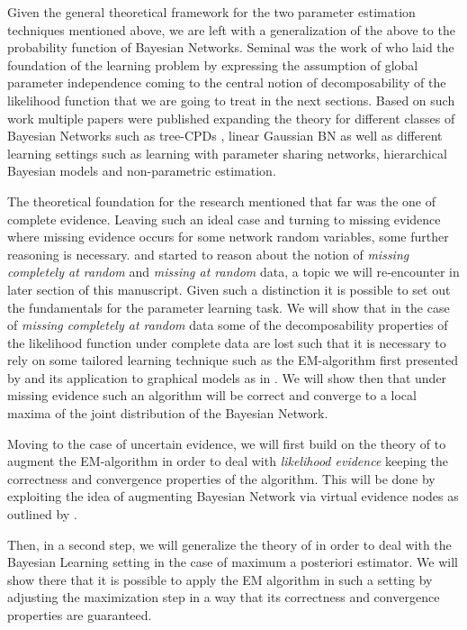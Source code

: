 \documentclass[11pt]{article}
\begin{document}
\begin{article}
Given the general theoretical framework for the two parameter
estimation techniques mentioned above, we are left with a
generalization of the above to the probability function of Bayesian
Networks. Seminal was the work of \cite{spiegelhalter1990sequential}
who laid the foundation of the learning problem by expressing the
assumption of global parameter independence coming to the central
notion of decomposability of the likelihood function that we are
going to treat in the next sections. Based on such work multiple
papers were published expanding the theory for different classes of
Bayesian Networks such as tree-CPDs \cite{buntine1993tree}, linear
Gaussian BN \cite{heckerman1995learning} as well as different
learning settings such as learning with parameter sharing networks,
hierarchical Bayesian models and non-parametric estimation.

The theoretical foundation for the research mentioned that far was
the one of complete evidence. Leaving such an ideal case and
turning to missing evidence where missing evidence occurs for some
network random variables, some further reasoning is
necessary. \cite{rubin1976inference} and \cite{little1976inference}
started to reason about the notion of \emph{missing completely at
random} and \emph{missing at random} data, a topic we will re-encounter
in later section of this manuscript. Given such a distinction it is
possible to set out the fundamentals for the parameter learning
task. We will show that in the case of \emph{missing completely at
random} data some of the decomposability properties of the
likelihood function under complete data are lost such that it is
necessary to rely on some tailored learning technique such as the
EM-algorithm first presented by \cite{dempster1977maximum} and its
application to graphical models as in \cite{lauritzen1995algorithm}.
We will show then that under missing evidence such an algorithm
will be correct and converge to a local maxima of the joint
distribution of the Bayesian Network.

Moving to the case of uncertain evidence, we will first build on
the theory of \cite{Wasserkrug_all} to augment the EM-algorithm in
order to deal with \emph{likelihood evidence} keeping the correctness
and convergence properties of the algorithm. This will be done by
exploiting the idea of augmenting Bayesian Network via virtual
evidence nodes as outlined by \cite{pearl2014probabilistic}.

Then, in a second step, we will generalize the theory of
\cite{Wasserkrug_all} in order to deal with the Bayesian Learning
setting in the case of maximum a posteriori estimator. We will show
there that it is possible to apply the EM algorithm in such a
setting by adjusting the maximization step in a way that its
correctness and convergence properties are guaranteed.


\end{article}
\end{document}
